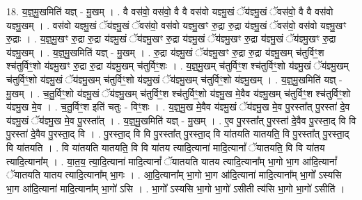 \documentclass[17pt]{extarticle}
\begin{document}
18. य॒ज्ञ्॒मु॒खमिति॑ यज्ञ् - मु॒खम् । . वै वस॑वो॒ वस॑वो॒ वै वै वस॑वो यज्ञ्मु॒खं ॅय॑ज्ञ्मु॒खं ॅवस॑वो॒ वै वै वस॑वो यज्ञ्मु॒खम् । . वस॑वो यज्ञ्मु॒खं ॅय॑ज्ञ्मु॒खं ॅवस॑वो॒ वस॑वो यज्ञ्मु॒खꣳ रु॒द्रा रु॒द्रा य॑ज्ञ्मु॒खं ॅवस॑वो॒ वस॑वो यज्ञ्मु॒खꣳ रु॒द्राः । . य॒ज्ञ्॒मु॒खꣳ रु॒द्रा रु॒द्रा य॑ज्ञ्मु॒खं ॅय॑ज्ञ्मु॒खꣳ रु॒द्रा य॑ज्ञ्मु॒खं ॅय॑ज्ञ्मु॒खꣳ रु॒द्रा य॑ज्ञ्मु॒खं ॅय॑ज्ञ्मु॒खꣳ रु॒द्रा य॑ज्ञ्मु॒खम् । . य॒ज्ञ्॒मु॒खमिति॑ यज्ञ् - मु॒खम् । . रु॒द्रा य॑ज्ञ्मु॒खं ॅय॑ज्ञ्मु॒खꣳ रु॒द्रा रु॒द्रा य॑ज्ञ्मु॒खम् च॑तुर्विꣳ॒॒श श्च॑तुर्विꣳ॒॒शो य॑ज्ञ्मु॒खꣳ रु॒द्रा रु॒द्रा य॑ज्ञ्मु॒खम् च॑तुर्विꣳ॒॒शः । . य॒ज्ञ्॒मु॒खम् च॑तुर्विꣳ॒॒श श्च॑तुर्विꣳ॒॒शो य॑ज्ञ्मु॒खं ॅय॑ज्ञ्मु॒खम् च॑तुर्विꣳ॒॒शो य॑ज्ञ्मु॒खं ॅय॑ज्ञ्मु॒खम् च॑तुर्विꣳ॒॒शो य॑ज्ञ्मु॒खं ॅय॑ज्ञ्मु॒खम् च॑तुर्विꣳ॒॒शो य॑ज्ञ्मु॒खम् । . य॒ज्ञ्॒मु॒खमिति॑ यज्ञ् - मु॒खम् । . च॒तु॒र्विꣳ॒॒शो य॑ज्ञ्मु॒खं ॅय॑ज्ञ्मु॒खम् च॑तुर्विꣳ॒॒श श्च॑तुर्विꣳ॒॒शो य॑ज्ञ्मु॒ख मे॒वैव य॑ज्ञ्मु॒खम् च॑तुर्विꣳ॒॒श श्च॑तुर्विꣳ॒॒शो य॑ज्ञ्मु॒ख मे॒व । . च॒तु॒र्विꣳ॒॒श इति॑ चतुः - विꣳ॒॒शः । . य॒ज्ञ्॒मु॒ख मे॒वैव य॑ज्ञ्मु॒खं ॅय॑ज्ञ्मु॒ख मे॒व पु॒रस्ता᳚त् पु॒रस्ता॑ दे॒व य॑ज्ञ्मु॒खं ॅय॑ज्ञ्मु॒ख मे॒व पु॒रस्ता᳚त् । . य॒ज्ञ्॒मु॒खमिति॑ यज्ञ् - मु॒खम् । . ए॒व पु॒रस्ता᳚त् पु॒रस्ता॑ दे॒वैव पु॒रस्ता॒द् वि वि पु॒रस्ता॑ दे॒वैव पु॒रस्ता॒द् वि । . पु॒रस्ता॒द् वि वि पु॒रस्ता᳚त् पु॒रस्ता॒द् वि या॑तयति यातयति॒ वि पु॒रस्ता᳚त् पु॒रस्ता॒द् वि या॑तयति । . वि या॑तयति यातयति॒ वि वि या॑तय त्यादि॒त्याना॑ मादि॒त्यानां᳚ ॅयातयति॒ वि वि या॑तय त्यादि॒त्याना᳚म् । . या॒त॒य॒ त्या॒दि॒त्याना॑ मादि॒त्यानां᳚ ॅयातयति यातय त्यादि॒त्याना᳚म् भा॒गो भा॒ग आ॑दि॒त्यानां᳚ ॅयातयति यातय त्यादि॒त्याना᳚म् भा॒गः । . आ॒दि॒त्याना᳚म् भा॒गो भा॒ग आ॑दि॒त्याना॑ मादि॒त्याना᳚म् भा॒गो᳚ ऽस्यसि भा॒ग आ॑दि॒त्याना॑ मादि॒त्याना᳚म् भा॒गो॑ ऽसि । . भा॒गो᳚ ऽस्यसि भा॒गो भा॒गो॑ ऽसीती त्य॑सि भा॒गो भा॒गो॑ ऽसीति॑ । \newline
\end{document}
